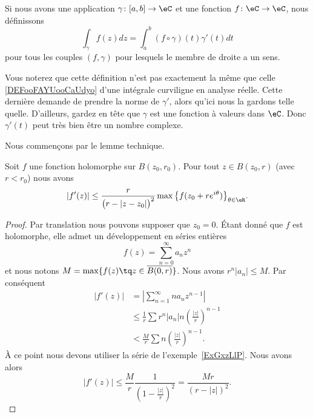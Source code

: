 \begin{definition}      \label{DEFooBPLJooZwsmxi}
	Si nous avons une application \( \gamma\colon \mathopen[ a , b \mathclose]\to \eC\) et une fonction \( f\colon \eC\to \eC\), nous définissons
	\begin{equation}
		\int_{\gamma}f(z)dz=\int_a^b(f\circ \gamma)(t)\gamma'(t)dt
	\end{equation}
	pour tous les couples \( (f,\gamma)\) pour lesquels le membre de droite a un sens.
\end{definition}
Vous noterez que cette définition n'est pas exactement la même que celle \ref{DEFooFAYUooCaUdyo} d'une intégrale curviligne en analyse réelle. Cette dernière demande de prendre la norme de \( \gamma'\), alors qu'ici nous la gardons telle quelle. D'ailleurs, gardez en tête que \( \gamma\) est une fonction à valeurs dans \( \eC\). Donc \( \gamma'(t)\) peut très bien être un nombre complexe.

Nous commençons par le lemme technique.
\begin{lemma}       \label{LemNAnweA}
	Soit \( f\) une fonction holomorphe sur \( B(z_0,r_0)\). Pour tout \( z\in B(z_0,r)\) (avec \( r<r_0\)) nous avons
	\begin{equation}
		| f'(z) |\leq \frac{ r }{ \big( r-| z-z_0 | \big)^2 }\max\big\{ f(z_0+r e^{i\theta}) \big\}_{\theta\in \eR}.
	\end{equation}
\end{lemma}

\begin{proof}
	Par translation nous pouvons supposer que \( z_0=0\). Étant donné que \( f\) est holomorphe, elle admet un développement en séries entières
	\begin{equation}
		f(z)=\sum_{n=0}^{\infty}a_nz^n
	\end{equation}
	et nous notons \( M=\max\{ f(z)\tq z\in \overline{ B(0,r) } \}\). Nous avons \( r^n| a_n |\leq M\). Par conséquent
	\begin{subequations}
		\begin{align}
			| f'(z) | & =\left| \sum_{n=1}^{\infty}na_nz^{n-1} \right|                            \\
			          & \leq\frac{1}{ r }\sum r^n| a_n |n\left( \frac{ | z | }{ r } \right)^{n-1} \\
			          & <\frac{ M }{ r }\sum n\left( \frac{ | z | }{ r } \right)^{n-1}.
		\end{align}
	\end{subequations}
	À ce point nous devons utiliser la série de l'exemple~\ref{ExGxzLlP}. Nous avons alors
	\begin{equation}
		| f'(z) |\leq \frac{ M }{ r }\frac{ 1 }{ \left( 1-\frac{ | z | }{ r } \right)^2 }=\frac{ Mr }{ (r-| z |)^2 }.
	\end{equation}
\end{proof}

